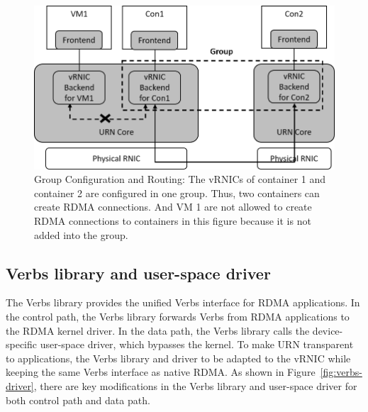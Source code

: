 \begin{figure}[!ht]
	\centering
	\includegraphics[width=1.0\linewidth]{images/route-config}
	\caption{Group Configuration and Routing: The vRNICs of container 1 and container 2 are configured in one group. Thus, two containers can create RDMA connections. And VM 1 are not allowed to create RDMA connections to containers in this figure because it is not added into the group. }
	\label{fig:route-config}
\end{figure}

\subsection{Verbs library and user-space driver}

The Verbs library provides the unified Verbs interface for RDMA applications. In the control path, the Verbs library forwards Verbs from RDMA applications to the RDMA kernel driver. In the data path, the Verbs library calls the device-specific user-space driver, which bypasses the kernel. To make URN transparent to applications, the Verbs library and driver to be adapted to the vRNIC while keeping the same Verbs interface as native RDMA. As shown in Figure~\ref{fig:verbs-driver}, there are key modifications in the Verbs library and user-space driver for both control path and data path.


